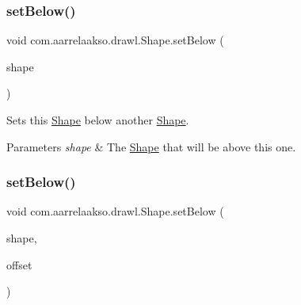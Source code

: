 \subsubsection{\texorpdfstring{set\+Below()}{setBelow()}\hspace{0.1cm}{\footnotesize\ttfamily [1/2]}}
{\footnotesize\ttfamily void com.\+aarrelaakso.\+drawl.\+Shape.\+set\+Below (\begin{DoxyParamCaption}\item[{@Not\+Null final \hyperlink{classcom_1_1aarrelaakso_1_1drawl_1_1_shape}{Shape}}]{shape }\end{DoxyParamCaption})\hspace{0.3cm}{\ttfamily [inherited]}}



Sets this \hyperlink{classcom_1_1aarrelaakso_1_1drawl_1_1_shape}{Shape} below another \hyperlink{classcom_1_1aarrelaakso_1_1drawl_1_1_shape}{Shape}. 


\begin{DoxyParams}{Parameters}
{\em shape} & The \hyperlink{classcom_1_1aarrelaakso_1_1drawl_1_1_shape}{Shape} that will be above this one. \\
\hline
\end{DoxyParams}
\mbox{\label{classcom_1_1aarrelaakso_1_1drawl_1_1_shape_a63c902c4e79235901744c6d83544fa54}} 
\subsubsection{\texorpdfstring{set\+Below()}{setBelow()}\hspace{0.1cm}{\footnotesize\ttfamily [2/2]}}
{\footnotesize\ttfamily void com.\+aarrelaakso.\+drawl.\+Shape.\+set\+Below (\begin{DoxyParamCaption}\item[{@Not\+Null final \hyperlink{classcom_1_1aarrelaakso_1_1drawl_1_1_shape}{Shape}}]{shape,  }\item[{@Not\+Null final \hyperlink{classcom_1_1aarrelaakso_1_1drawl_1_1_measure}{Measure}}]{offset }\end{DoxyParamCaption})\hspace{0.3cm}{\ttfamily [inherited]}}



